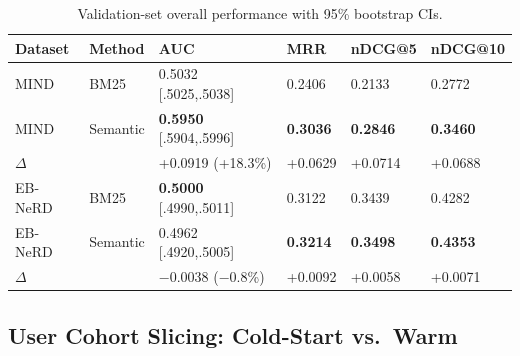\documentclass[11pt,a4paper]{article}
\begin{document}
\begin{table}[h!]
  \centering
  \caption{Validation-set overall performance with 95\% bootstrap CIs.}
  \label{tab:overall}
  \small
  \setlength{\tabcolsep}{3.5pt}
  \begin{tabularx}{\linewidth}{l l X X X X}
    \toprule
    \textbf{Dataset} & \textbf{Method} & \textbf{AUC} & \textbf{MRR} & \textbf{nDCG@5} & \textbf{nDCG@10} \\
    \midrule
    MIND & BM25 & 0.5032 [.5025,.5038] & 0.2406 & 0.2133 & 0.2772 \\
    MIND & Semantic & \textbf{0.5950} [.5904,.5996] & \textbf{0.3036} & \textbf{0.2846} & \textbf{0.3460} \\
    \quad\small$\Delta$ & & +0.0919 (+18.3\%) & +0.0629 & +0.0714 & +0.0688 \\
    \midrule
    EB-NeRD & BM25 & \textbf{0.5000} [.4990,.5011] & 0.3122 & 0.3439 & 0.4282 \\
    EB-NeRD & Semantic & 0.4962 [.4920,.5005] & \textbf{0.3214} & \textbf{0.3498} & \textbf{0.4353} \\
    \quad\small$\Delta$ & & $-$0.0038 ($-$0.8\%) & +0.0092 & +0.0058 & +0.0071 \\
    \bottomrule
  \end{tabularx}
\end{table}

\subsection{User Cohort Slicing: Cold-Start vs.\ Warm}
\end{document}
